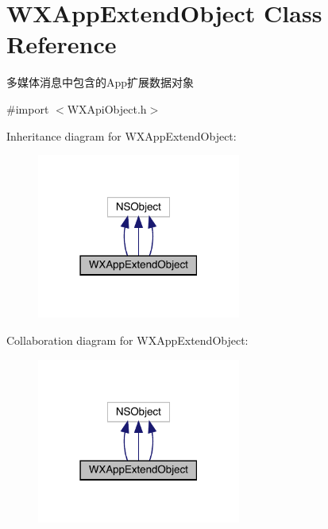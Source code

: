 \hypertarget{interface_w_x_app_extend_object}{}\section{W\+X\+App\+Extend\+Object Class Reference}
\label{interface_w_x_app_extend_object}


多媒体消息中包含的\+App扩展数据对象  




{\ttfamily \#import $<$W\+X\+Api\+Object.\+h$>$}



Inheritance diagram for W\+X\+App\+Extend\+Object\+:\nopagebreak
\begin{figure}[H]
\begin{center}
\leavevmode
\includegraphics[width=190pt]{interface_w_x_app_extend_object__inherit__graph}
\end{center}
\end{figure}


Collaboration diagram for W\+X\+App\+Extend\+Object\+:\nopagebreak
\begin{figure}[H]
\begin{center}
\leavevmode
\includegraphics[width=190pt]{interface_w_x_app_extend_object__coll__graph}
\end{center}
\end{figure}
